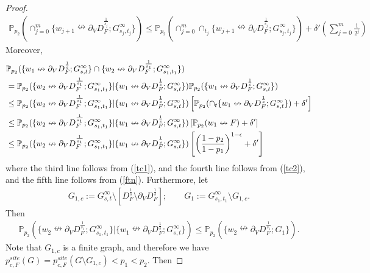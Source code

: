 \documentclass[10pt,a4paper]{amsart}
\newcommand\PP{{\mathbb P}}
\begin{document}
\begin{proof}
\begin{align}
\PP_{p_2}(\cap_{j=0}^{m}\{w_{j+1}\nleftrightarrow \partial_V D_F^{\frac{1}{s_j}};G_{s_j,t_j}^{\infty}\})\leq 
\PP_{p_2}(\cap_{j=0}^{m}\cap_{t_j}\{w_{j+1}\nleftrightarrow \partial_V D_F^{\frac{1}{s_j}};G_{s_j,t_j}^{\infty}\})+\delta'\left(\sum_{j=0}^m\frac{1}{2^j}\right)\label{tc1}
\end{align}
Moreover,
\begin{align}
\label{s20}
&\PP_{p_2}(\{w_1\nleftrightarrow \partial_V D_F^{\frac{1}{s}};G_{s,t}^{\infty}\}\cap \{w_2\nleftrightarrow \partial_V D_F^{\frac{1}{s_1}};G_{s_1,t_1}^{\infty}\})\\
&=\PP_{p_2}(\{w_2\nleftrightarrow \partial_V D_F^{\frac{1}{s_1}};G_{s_1,t_1}^{\infty}\}|\{w_1\nleftrightarrow \partial_V D_F^{\frac{1}{s}};G_{s,t}^{\infty}\})\PP_{p_2}(\{w_1\nleftrightarrow \partial_V D_F^{\frac{1}{s}};G_{s,t}^{\infty}\})\notag\\
&\leq \PP_{p_2}(\{w_2\nleftrightarrow \partial_V D_F^{\frac{1}{s_1}};G_{s_1,t_1}^{\infty}\}|\{w_1\nleftrightarrow \partial_V D_F^{\frac{1}{s}};G_{s,t}^{\infty}\})
\left[\PP_{p_2}(\cap_t\{w_1\nleftrightarrow \partial_V D_F^{\frac{1}{s}};G_{s,t}^{\infty}\})+\delta'\right]\notag\\
&\leq \PP_{p_2}(\{w_2\nleftrightarrow \partial_V D_F^{\frac{1}{s_1}};G_{s_1,t_1}^{\infty}\}|\{w_1\nleftrightarrow \partial_V D_F^{\frac{1}{s}};G_{s,t}^{\infty}\})
\left[\PP_{p_2}(w_1\nleftrightarrow F)+\delta'\right]\notag\\
&\leq \PP_{p_2}(\{w_2\nleftrightarrow \partial_V D_F^{\frac{1}{s_1}};G_{s_1,t_1}^{\infty}\}|\{w_1\nleftrightarrow \partial_V D_F^{\frac{1}{s}};G_{s,t}^{\infty}\})
\left[\left(\frac{1-p_2}{1-p_1}\right)^{1-\epsilon}+\delta'\right]\notag
\end{align}
where the third line follows from (\ref{tc1}), and the fourth line follows from (\ref{tc2}), and the fifth line follows from (\ref{ftn}).
Furthermore, let
\begin{align*}
G_{1,c}:=G_{s,t}^{\infty}\setminus [D_F^{\frac{1}{s}}\setminus \partial_V D_F^{\frac{1}{s}}];\qquad
G_1:=G_{s_1,t_1}^{\infty}\setminus G_{1,c}.
\end{align*}
Then
\begin{align}
\PP_{p_2}(\{w_2\nleftrightarrow \partial_V D_F^{\frac{1}{s_1}};G_{s_1,t_1}^{\infty}\}|\{w_1\nleftrightarrow \partial_V D_F^{\frac{1}{s}};G_{s,t}^{\infty}\})\leq \PP_{p_2}(\{w_2\nleftrightarrow \partial_V D_F^{\frac{1}{s_1}};G_1\}).\label{s21}
\end{align}
Note that $G_{1,c}$ is a finite graph, and therefore we have $p_{c,F}^{site}(G)=p_{c,F}^{site}(G\setminus G_{1,c})<p_1<p_2$. Then

\end{proof}
\end{document}
